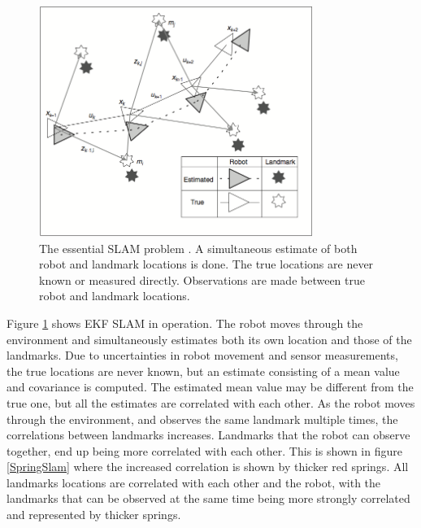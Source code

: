 \documentclass[conference]{IEEEtran}
\begin{document}
\begin{figure}[!t]
\centering
\includegraphics[width=3.5in]{./figures/EssSlam.png}
\caption{The essential SLAM problem \cite{slam1}. A simultaneous estimate of both robot and landmark locations is done. The true locations are never known or measured directly. Observations are made between true robot and landmark locations.}
\label{EssSlam}
\end{figure}

Figure \ref{EssSlam} shows EKF SLAM in operation. The robot moves through the environment and simultaneously estimates both its own location and those of the landmarks. Due to uncertainties in robot movement and sensor measurements, the true locations are never known, but an estimate consisting of a mean value and covariance is computed. The estimated mean value may be different from the true one, but all the estimates are correlated with each other. As the robot moves through the environment, and observes the same landmark multiple times, the correlations between landmarks increases. Landmarks that the robot can observe together, end up being more correlated with each other. This is shown in figure \ref{SpringSlam} where the increased correlation is shown by thicker red springs. All landmarks locations are correlated with each other and the robot, with the landmarks that can be observed at the same time being more strongly correlated and represented by thicker springs.\\
\end{document}
